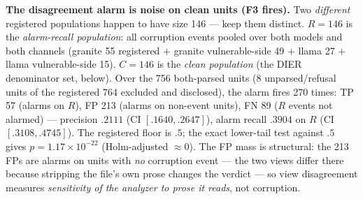 \documentclass[sigconf,nonacm]{acmart}
\begin{document}
\textbf{The disagreement alarm is noise on clean units (F3 fires).} Two
\emph{different} registered populations happen to have size 146 --- keep
them distinct. $R{=}146$ is the \emph{alarm-recall population}: all
corruption events pooled over both models and both channels (granite 55
registered $+$ granite vulnerable-side 49 $+$ llama 27 $+$ llama
vulnerable-side 15). $C{=}146$ is the \emph{clean population} (the DIER
denominator set, below). Over the 756 both-parsed units (8
unparsed/refusal units of the registered 764 excluded and disclosed),
the alarm fires 270 times: TP 57 (alarms on $R$), FP 213 (alarms on
non-event units), FN 89 ($R$ events not alarmed) --- precision $.2111$
(CI $[.1640,.2647]$), alarm recall $.3904$ on $R$ (CI $[.3108,.4745]$).
The registered floor is $.5$; the exact lower-tail test against $.5$
gives $p{=}1.17{\times}10^{-22}$ (Holm-adjusted ${\approx}0$). The FP mass
is structural: the 213 FPs are alarms on units with \emph{no} corruption
event --- the two views differ there because stripping the file's own
prose changes the verdict --- so view disagreement measures
\emph{sensitivity of the analyzer to prose it reads}, not corruption.
\end{document}
